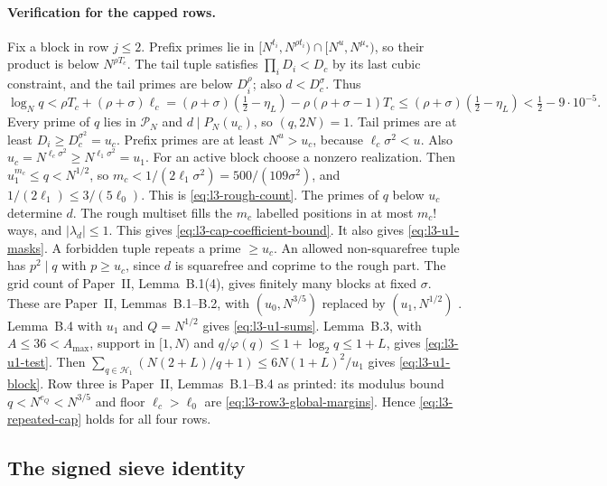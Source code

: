 \paragraph{Verification for the capped rows.}
Fix a block in row $j\le2$. Prefix primes lie in
$[N^{t_i},N^{\rho t_i})\cap[N^u,N^{\mu_*})$, so their product is below
$N^{\rho T_c}$. The tail tuple satisfies $\prod_iD_i<D_c$ by its last
cubic constraint, and the tail primes are below $D_i^\rho$; also
$d<D_c^\sigma$. Thus
\[
 \log_Nq<\rho T_c+(\rho+\sigma)\ell_c
 =(\rho+\sigma)(\tfrac12-\eta_L)-\rho(\rho+\sigma-1)T_c
 \le(\rho+\sigma)(\tfrac12-\eta_L)<\tfrac12-9\cdot10^{-5}.
\]
Every prime of $q$ lies in $\mathcal P_N$ and $d\mid P_N(u_c)$, so
$(q,2N)=1$. Tail primes are at least $D_i\ge D_c^{\sigma^2}=u_c$.
Prefix primes are at least $N^u>u_c$, because $\ell_c\sigma^2<u$.
Also $u_c=N^{\ell_c\sigma^2}\ge N^{\ell_1\sigma^2}=u_1$.
For an active block choose a nonzero realization. Then
$u_1^{m_c}\le q<N^{1/2}$, so $m_c<1/(2\ell_1\sigma^2)=500/(109\sigma^2)$,
and $1/(2\ell_1)\le3/(5\ell_0)$. This is \eqref{eq:l3-rough-count}.
The primes of $q$ below $u_c$ determine $d$. The rough multiset fills
the $m_c$ labelled positions in at most $m_c!$ ways, and $|\lambda_d|\le1$.
This gives \eqref{eq:l3-cap-coefficient-bound}. It also gives
\eqref{eq:l3-u1-masks}. A forbidden tuple repeats a prime $\ge u_c$.
An allowed non-squarefree tuple has $p^2\mid q$ with $p\ge u_c$,
since $d$ is squarefree and coprime to the rough part. The grid count of
Paper~II, Lemma~B.1(4), gives finitely many blocks at fixed $\sigma$.
These are Paper~II, Lemmas~B.1--B.2, with $(u_0,N^{3/5})$ replaced by
$(u_1,N^{1/2})$ \cite[Appendix~B.1, Lemmas~B.1--B.2]{PaperII}.
Lemma~B.4 with $u_1$ and $Q=N^{1/2}$ gives \eqref{eq:l3-u1-sums}.
Lemma~B.3, with $A\le36<A_{\max}$, support in $[1,N)$ and
$q/\varphi(q)\le1+\log_2q\le1+L$, gives \eqref{eq:l3-u1-test}.
Then $\sum_{q\in\mathcal H_1}(N(2+L)/q+1)\le6N(1+L)^2/u_1$ gives
\eqref{eq:l3-u1-block}. Row three is Paper~II, Lemmas~B.1--B.4 as
printed: its modulus bound $q<N^{e_Q}<N^{3/5}$ and floor
$\ell_c>\ell_0$ are \eqref{eq:l3-row3-global-margins}. Hence
\eqref{eq:l3-repeated-cap} holds for all four rows.

\subsection{The signed sieve identity}

